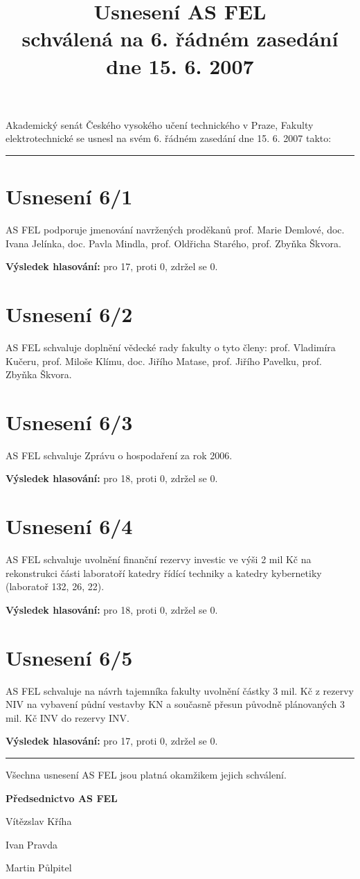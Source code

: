 \documentclass[a4paper,12pt,notitlepage]{article}
\title{Usnesení AS FEL\\schválená na 6. řádném zasedání dne 15. 6. 2007}
\author{}\date{}
\newcommand{\hr}{\bigskip\hrule\bigskip}
\newcommand{\usneseni}[5]{
\section*{#1}

#2

\textbf{Výsledek hlasování:} pro #3, proti #4, zdržel se #5.}
\begin{document}
\maketitle


Akademický senát Českého vysokého učení technického v Praze, Fakulty
elektrotechnické se usnesl na svém 6. řádném zasedání dne 15. 6. 2007 takto:\hr


\usneseni{Usnesení 6/1}{AS FEL podporuje jmenování navržených proděkanů prof. Marie Demlové, doc. Ivana Jelínka, doc. Pavla Mindla, prof. Oldřicha Starého, prof. Zbyňka Škvora.}{17}{0}{0}

\section*{Usnesení 6/2}

AS FEL schvaluje doplnění vědecké rady fakulty o tyto členy: prof. Vladimíra Kučeru, prof. Miloše Klímu, doc. Jiřího Matase, prof. Jiřího Pavelku, prof. Zbyňka Škvora.

\usneseni{Usnesení 6/3}{AS FEL schvaluje Zprávu o hospodaření za rok 2006.}{18}{0}{0}

\pagebreak

\usneseni{Usnesení 6/4}{AS FEL schvaluje uvolnění finanční rezervy investic ve výši 2 mil Kč na rekonstrukci části laboratoří katedry řídící techniky a katedry kybernetiky (laboratoř 132, 26, 22).}{18}{0}{0}

\usneseni{Usnesení 6/5}{AS FEL schvaluje na návrh tajemníka fakulty uvolnění částky 3 mil. Kč z rezervy NIV na vybavení půdní vestavby KN a současně přesun původně plánovaných 3 mil. Kč INV do rezervy INV.}{17}{0}{0}


\hr
Všechna usnesení AS FEL jsou platná okamžikem jejich schválení.

\begin{center}
\textbf{Předsednictvo AS FEL}

Vítězslav Kříha

Ivan Pravda

Martin Půlpitel
\end{center}
\end{document}
